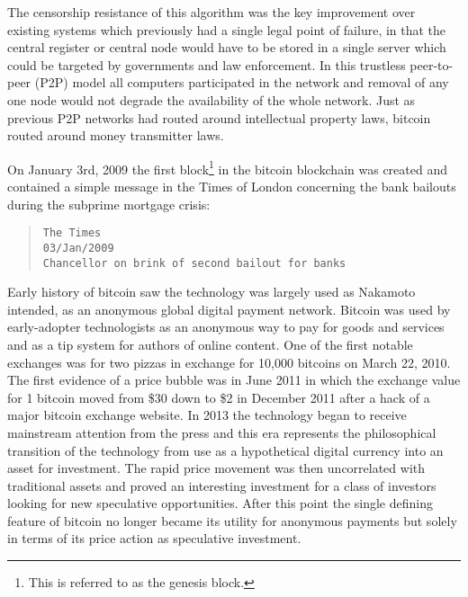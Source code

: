 The censorship resistance of this algorithm was the key improvement over
existing systems which previously had a single legal point of failure, in that
the central register or central node would have to be stored in a single server
which could be targeted by governments and law enforcement. In this trustless
peer-to-peer (P2P) model all computers participated in the network and removal
of any one node would not degrade the availability of the whole
network. Just as previous P2P networks had routed around intellectual property
laws, bitcoin routed around money transmitter laws.

On January 3rd, 2009 the first block\footnote{This is referred to as the
genesis block.} in the bitcoin blockchain was created and contained a simple
message in the Times of London concerning the bank bailouts during the subprime
mortgage crisis:

\begin{quote}
\begin{verbatim}
The Times
03/Jan/2009
Chancellor on brink of second bailout for banks
\end{verbatim}
\end{quote}

Early history of bitcoin saw the technology was largely used as Nakamoto
intended, as an anonymous global digital payment network.  Bitcoin was used by
early-adopter technologists as an anonymous way to pay for goods and services
and as a tip system for authors of online content. One of the first notable
exchanges was for two pizzas in exchange for 10,000 bitcoins on March 22, 2010.
The first evidence of a price bubble was in June 2011 in which the exchange
value for 1 bitcoin moved from \$30 down to \$2 in December 2011 after a hack of
a major bitcoin exchange website.  In 2013 the technology began to receive
mainstream attention from the press and this era represents the philosophical
transition of the technology from use as a hypothetical digital currency into an
asset for investment. The rapid price movement was then uncorrelated with
traditional assets and proved an interesting investment for a class of investors
looking for new speculative opportunities. After this point the single defining
feature of bitcoin no longer became its utility for anonymous payments but
solely in terms of its price action as speculative investment.

